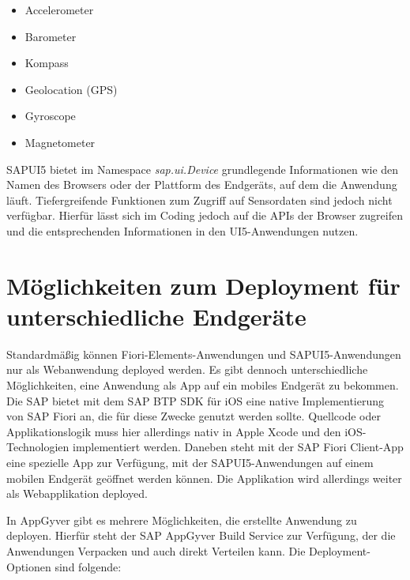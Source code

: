 \begin{itemize}[noitemsep]
\item Accelerometer 
\item Barometer
\item Kompass
\item Geolocation (GPS) 
\item Gyroscope
\item Magnetometer
\end{itemize}

SAPUI5 bietet im Namespace \textit{sap.ui.Device} grundlegende Informationen wie den Namen des Browsers oder der Plattform des Endgeräts, auf dem die Anwendung läuft. Tiefergreifende Funktionen zum Zugriff auf Sensordaten sind  jedoch nicht verfügbar. Hierfür lässt sich im Coding jedoch auf die APIs der Browser zugreifen und die entsprechenden Informationen in den UI5-Anwendungen nutzen.

\section{Möglichkeiten zum Deployment für unterschiedliche Endgeräte}

Standardmäßig können Fiori-Elements-Anwendungen und SAPUI5-Anwendungen nur als Webanwendung deployed werden. Es gibt dennoch unterschiedliche Möglichkeiten, eine Anwendung als App auf ein mobiles Endgerät zu bekommen. Die SAP bietet mit dem SAP BTP SDK für iOS eine native Implementierung von SAP Fiori an, die für diese Zwecke genutzt werden sollte. Quellcode oder Applikationslogik muss hier allerdings nativ in Apple Xcode und den iOS-Technologien implementiert werden. Daneben steht mit der SAP Fiori Client-App eine spezielle App zur Verfügung, mit der SAPUI5-Anwendungen auf einem mobilen Endgerät geöffnet werden können. Die Applikation wird allerdings weiter als Webapplikation deployed.

In AppGyver gibt es mehrere Möglichkeiten, die erstellte Anwendung zu deployen. Hierfür steht der SAP AppGyver Build Service zur Verfügung, der die Anwendungen Verpacken und auch direkt Verteilen kann. Die Deployment-Optionen sind folgende:


